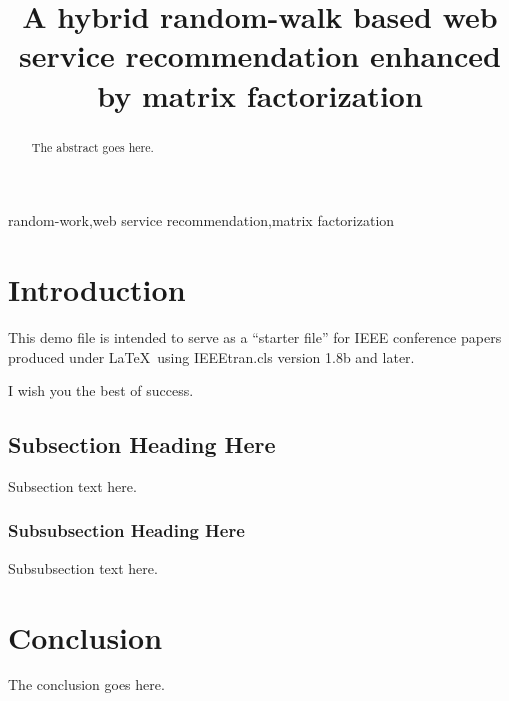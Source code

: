 \documentclass[conference]{IEEEtran}
\begin{document}
\title{A hybrid random-walk based web service recommendation enhanced by matrix factorization}

\author{
  \and
}

\maketitle

\begin{abstract}
The abstract goes here.
\end{abstract}

\begin{IEEEkeywords}
  random-work,web service recommendation,matrix factorization
\end{IEEEkeywords}

\IEEEpeerreviewmaketitle


\section{Introduction}
This demo file is intended to serve as a ``starter file''
for IEEE conference papers produced under \LaTeX\ using
IEEEtran.cls version 1.8b and later.
\par I wish you the best of success.

\subsection{Subsection Heading Here}
Subsection text here.


\subsubsection{Subsubsection Heading Here}
Subsubsection text here.



\section{Conclusion}
The conclusion goes here.
\end{document}
